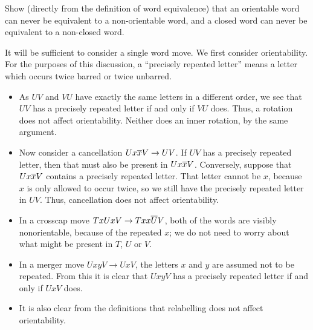 \documentclass[a4paper]{amsart}
\begin{document}
\begin{exercise}
 Show (directly from the definition of word equivalence) that an
 orientable word can never be equivalent to a non-orientable word, and
 a closed word can never be equivalent to a non-closed word.
\end{exercise}
\begin{solution}
 It will be sufficient to consider a single word move.  We first
 consider orientability.  For the purposes of this discussion, a
 ``precisely repeated letter'' means a letter which occurs twice
 barred or twice unbarred.
 \begin{itemize}
  \item As $UV$ and $VU$ have exactly the same letters in a different
   order, we see that $UV$ has a precisely repeated letter if and only
   if $VU$ does.  Thus, a rotation does not affect orientability.
   Neither does an inner rotation, by the same argument.
  \item Now consider a cancellation $Ux\overline{x} V\to UV$.  If $UV$ has a
   precisely repeated letter, then that must also be present in
   $Ux\overline{x} V$.  Conversely, suppose that $Ux\overline{x} V$ contains a precisely
   repeated letter.  That letter cannot be $x$, because $x$ is only
   allowed to occur twice, so we still have the precisely repeated
   letter in $UV$.  Thus, cancellation does not affect orientability.
  \item In a crosscap move $TxUxV\to Txx\overline{U}V$, both of the words
   are visibly nonorientable, because of the repeated $x$; we do not
   need to worry about what might be present in $T$, $U$ or $V$.
  \item In a merger move $UxyV\to UxV$, the letters $x$ and $y$ are
   assumed not to be repeated.  From this it is clear that $UxyV$ has
   a precisely repeated letter if and only if $UxV$ does.
  \item It is also clear from the definitions that relabelling does
   not affect orientability.
 \end{itemize}


\end{solution}
\end{document}
